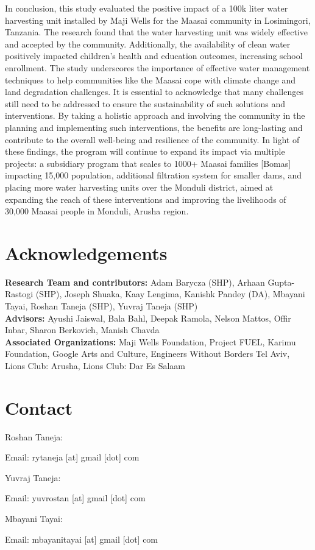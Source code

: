 \documentclass[10pt, twocolumn]{article}
\begin{document}
In conclusion, this study evaluated the positive impact of a 100k liter water harvesting unit installed by Maji Wells for the Maasai community in Losimingori, Tanzania. The research found that the water harvesting unit was widely effective and accepted by the community. Additionally, the availability of clean water positively impacted children's health and education outcomes, increasing school enrollment. The study underscores the importance of effective water management techniques to help communities like the Maasai cope with climate change and land degradation challenges. It is essential to acknowledge that many challenges still need to be addressed to ensure the sustainability of such solutions and interventions. By taking a holistic approach and involving the community in the planning and implementing such interventions, the benefits are long-lasting and contribute to the overall well-being and resilience of the community. In light of these findings, the program will continue to expand its impact via multiple projects: a subsidiary program that scales to 1000+ Maasai families [Bomas] impacting 15,000 population, additional filtration system for smaller dams, and placing more water harvesting units over the Monduli district, aimed at expanding the reach of these interventions and improving the livelihoods of 30,000 Maasai people in Monduli, Arusha region.















\section*{Acknowledgements}

\textbf{Research Team and contributors:} Adam Barycza (SHP), Arhaan Gupta-Rastogi (SHP), Joseph Shuaka, Kaay Lengima, Kanishk Pandey (DA), Mbayani Tayai, Roshan Taneja (SHP), Yuvraj Taneja (SHP)
\\ \newline
\textbf{Advisors:} Ayushi Jaiswal, Bala Bahl, Deepak Ramola, Nelson Mattos, Offir Inbar, Sharon Berkovich, Manish Chavda
\\ \newline
\textbf{Associated Organizations:} Maji Wells Foundation, Project FUEL, Karimu Foundation, Google Arts and Culture, Engineers Without Borders Tel Aviv, Lions Club: Arusha, Lions Club: Dar Es Salaam

\nocite{*}
\printbibliography

\section*{Contact}

Roshan Taneja:

Email: rytaneja [at] gmail [dot] com
\newline

Yuvraj Taneja:

Email: yuvrostan [at] gmail [dot] com
\newline

Mbayani Tayai:

Email: mbayanitayai [at] gmail [dot] com
\end{document}
